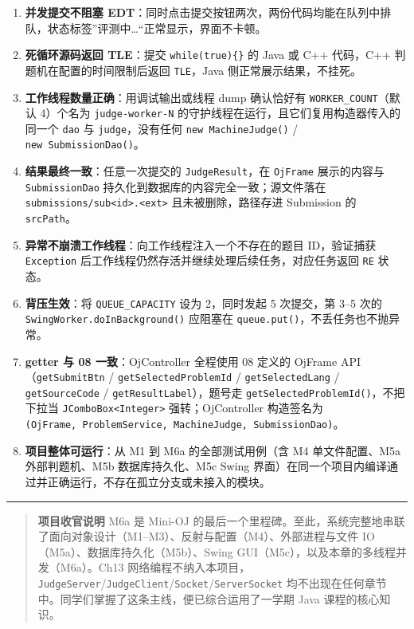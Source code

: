\documentclass[
  11pt,
]{ctexart}
\providecommand{\tightlist}{%
  \setlength{\itemsep}{0pt}\setlength{\parskip}{0pt}}
\begin{document}
\begin{enumerate}
\def\labelenumi{\arabic{enumi}.}
\tightlist
\item
  \textbf{并发提交不阻塞
  EDT}：同时点击提交按钮两次，两份代码均能在队列中排队，状态标签''评测中\ldots``正常显示，界面不卡顿。
\item
  \textbf{死循环源码返回 TLE}：提交 \texttt{while(true)\{\}} 的 Java 或
  C++ 代码，C++ 判题机在配置的时间限制后返回 \texttt{TLE}，Java
  侧正常展示结果，不挂死。
\item
  \textbf{工作线程数量正确}：用调试输出或线程 dump 确认恰好有
  \texttt{WORKER\_COUNT}（默认 4）个名为 \texttt{judge-worker-N}
  的守护线程在运行，且它们复用构造器传入的同一个 \texttt{dao} 与
  \texttt{judge}，没有任何 \texttt{new\ MachineJudge()} /
  \texttt{new\ SubmissionDao()}。
\item
  \textbf{结果最终一致}：任意一次提交的 \texttt{JudgeResult}，在
  \texttt{OjFrame} 展示的内容与 \texttt{SubmissionDao}
  持久化到数据库的内容完全一致；源文件落在
  \texttt{submissions/sub\textless{}id\textgreater{}.\textless{}ext\textgreater{}}
  且未被删除，路径存进 Submission 的 \texttt{srcPath}。
\item
  \textbf{异常不崩溃工作线程}：向工作线程注入一个不存在的题目
  ID，验证捕获 \texttt{Exception}
  后工作线程仍然存活并继续处理后续任务，对应任务返回 \texttt{RE} 状态。
\item
  \textbf{背压生效}：将 \texttt{QUEUE\_CAPACITY} 设为 2，同时发起 5
  次提交，第 3--5 次的 \texttt{SwingWorker.doInBackground()} 应阻塞在
  \texttt{queue.put()}，不丢任务也不抛异常。
\item
  \textbf{getter 与 08 一致}：OjController 全程使用 08 定义的 OjFrame
  API（\texttt{getSubmitBtn} / \texttt{getSelectedProblemId} /
  \texttt{getSelectedLang} / \texttt{getSourceCode} /
  \texttt{getResultLabel}），题号走
  \texttt{getSelectedProblemId()}，不把下拉当
  \texttt{JComboBox\textless{}Integer\textgreater{}} 强转；OjController
  构造签名为
  \texttt{(OjFrame,\ ProblemService,\ MachineJudge,\ SubmissionDao)}。
\item
  \textbf{项目整体可运行}：从 M1 到 M6a 的全部测试用例（含 M4
  单文件配置、M5a 外部判题机、M5b 数据库持久化、M5c Swing
  界面）在同一个项目内编译通过并正确运行，不存在孤立分支或未接入的模块。
\end{enumerate}

\begin{center}\rule{0.5\linewidth}{0.5pt}\end{center}

\begin{quote}
\textbf{项目收官说明} M6a 是 Mini-OJ
的最后一个里程碑。至此，系统完整地串联了面向对象设计（M1--M3）、反射与配置（M4）、外部进程与文件
IO（M5a）、数据库持久化（M5b）、Swing
GUI（M5c），以及本章的多线程并发（M6a）。Ch13
网络编程不纳入本项目，\texttt{JudgeServer}/\texttt{JudgeClient}/\texttt{Socket}/\texttt{ServerSocket}
均不出现在任何章节中。同学们掌握了这条主线，便已综合运用了一学期 Java
课程的核心知识。
\end{quote}
\end{document}

